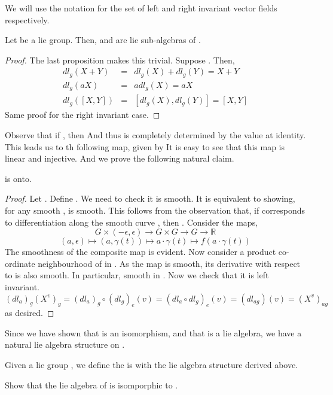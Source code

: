 \documentclass{article}
\newcommand*{\glrg}[1]{GL_{#1 \times #1}(\mathbb{R})}
\newcommand*{\mr}[1]{M_{#1 \times #1}(\mathbb{R})}
\begin{document}
We will use the notation  for the set of left and right invariant vector fields respectively.

\begin{proposition}
    Let  be a lie group. Then,  and  are lie sub-algebras of .
\end{proposition}
\begin{proof}
    The last proposition makes this trivial. Suppose . Then,
    \begin{eqnarray*}
        dl_g(X+Y) &=& dl_g(X)+dl_g(Y) = X+Y\\
        dl_g(aX) &=& adl_g(X) = aX\\
        dl_g([X,Y]) &=& [dl_g(X),dl_g(Y)] = [X,Y]
    \end{eqnarray*}
    Same proof for the right invariant case.
\end{proof}

Observe that if , then 
And thus  is completely determined by the value at identity. This leads us to 
th following map,  given by 
It is easy to see that this map is linear and injective. And we prove the following natural claim.

\begin{claim*}
     is onto.
\end{claim*}
\begin{proof}
    Let . Define . We need to check it is smooth. It is equivalent to showing,
    for any smooth ,  is smooth. This follows from the observation that, if  corresponds to 
    differentiation along the smooth curve , then .
    Consider the maps,
    $$G\times (-\epsilon,\epsilon)\to G\times G \to G \to \mathbb{R}$$
    $$(a,\epsilon) \mapsto (a,\gamma(t)) \mapsto a\cdot \gamma(t) \mapsto f(a\cdot \gamma(t))$$
    The smoothness of the composite map is evident. Now consider a product co-ordinate neighbourhood of  in 
    . As the map is smooth, its derivative with respect to  is also smooth. In particular, smooth in .
    Now we check that it is left invariant.
    $$(dl_a)_g(X^v)_g = (dl_a)_g\circ (dl_g)_e(v) = (dl_a\circ dl_g)_e(v) = (dl_{ag})(v) = (X^v)_{ag}$$
    as desired.
\end{proof}

Since we have shown that  is an isomorphism, and that  is a lie algebra, we have 
a natural lie algebra structure on .

\begin{definition}
    Given a lie group , we define the  is  with the lie algebra structure derived above.
\end{definition}

\begin{exercise}
    Show that the lie algebra of \mm{\glrg{n}} is isomporphic to \mm{\mr{n}}.
\end{exercise}
\end{document}
